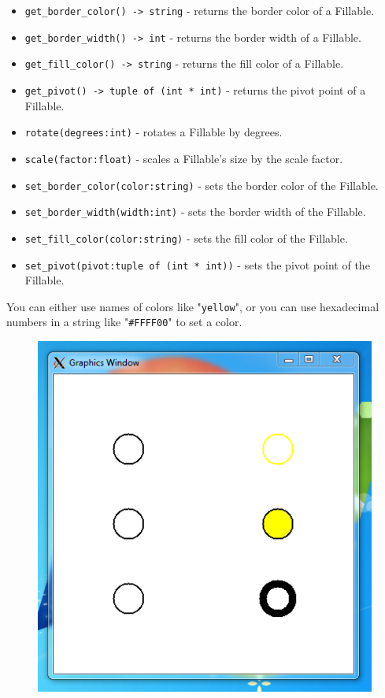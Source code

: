 \documentclass{article}
\begin{document}
\begin{itemize}
\item \verb|get_border_color() -> string| - returns the border color of a Fillable.
\item \verb|get_border_width() -> int| - returns the border width of a Fillable.
\item \verb|get_fill_color() -> string| - returns the fill color of a Fillable.
\item \verb|get_pivot() -> tuple of (int * int)| - returns the pivot point of a Fillable.
\item \verb|rotate(degrees:int)| - rotates a Fillable by degrees.
\item \verb|scale(factor:float)| - scales a Fillable's size by the scale factor. 
\item \verb|set_border_color(color:string)| - sets the border color of the Fillable.
\item \verb|set_border_width(width:int)| - sets the border width of the Fillable.
\item \verb|set_fill_color(color:string)| - sets the fill color of the Fillable.
\item \verb|set_pivot(pivot:tuple of (int * int))| - sets the pivot point of the Fillable.
\end{itemize}
You can either use names of colors like "\verb|yellow|", or you can use hexadecimal numbers in a string like "\verb|#FFFF00|" to set a color.

\begin{figure}[h]
\centering
\includegraphics[width=.5\textwidth]{fillableAttributes}


\end{figure}
\end{document}
